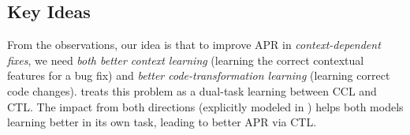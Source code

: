 
\subsection{Key Ideas}
\label{sec:key-idea}


From the observations, our idea is that to improve APR in {\em
  context-dependent fixes}, we need {\em both better context learning}
(learning the correct contextual features for a bug fix) and {\em
  better code-transformation learning} (learning correct code
changes). {\tool} treats this problem as a dual-task learning between
CCL and CTL. The impact from both directions (explicitly modeled in
{\tool}) helps both models learning better in its own task, leading to
better APR via CTL.







